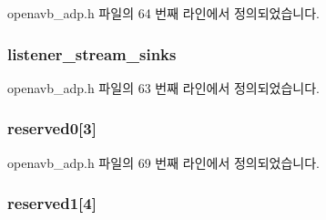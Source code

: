 openavb\+\_\+adp.\+h 파일의 64 번째 라인에서 정의되었습니다.

\subsubsection[{\texorpdfstring{listener\+\_\+stream\+\_\+sinks}{listener_stream_sinks}}]{ listener\+\_\+stream\+\_\+sinks}\hypertarget{structopenavb__adp__data__unit__t_afcd73932b3d14b611b7af06f5e11c79b}{}\label{structopenavb__adp__data__unit__t_afcd73932b3d14b611b7af06f5e11c79b}


openavb\+\_\+adp.\+h 파일의 63 번째 라인에서 정의되었습니다.

\subsubsection[{\texorpdfstring{reserved0}{reserved0}}]{ reserved0\mbox{[}3\mbox{]}}\hypertarget{structopenavb__adp__data__unit__t_a0c2fb64a266474c53c5b370e9f9bba70}{}\label{structopenavb__adp__data__unit__t_a0c2fb64a266474c53c5b370e9f9bba70}


openavb\+\_\+adp.\+h 파일의 69 번째 라인에서 정의되었습니다.

\subsubsection[{\texorpdfstring{reserved1}{reserved1}}]{ reserved1\mbox{[}4\mbox{]}}\hypertarget{structopenavb__adp__data__unit__t_a717895c028e3570d18efb49f76dd1fc6}{}\label{structopenavb__adp__data__unit__t_a717895c028e3570d18efb49f76dd1fc6}


